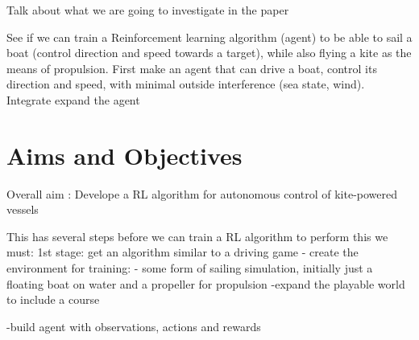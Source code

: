 Talk about what we are going to investigate in the paper

See if we can train a Reinforcement learning algorithm (agent) to be able to sail a boat (control direction and speed towards a target), while also flying a kite as the means of propulsion. 
First make an agent that can drive a boat, control its direction and speed, with minimal outside interference (sea state, wind).
Integrate expand the agent  






\section*{Aims and Objectives}

Overall aim : Develope a RL algorithm for autonomous control of kite-powered vessels



This has several steps before we can train a RL algorithm to perform this we must:
1st stage: get an algorithm similar to a driving game
- create the environment for training:
    - some form of sailing simulation, initially just a floating boat on water and a propeller for propulsion
-expand the playable world to include a course

-build agent with observations, actions and rewards

